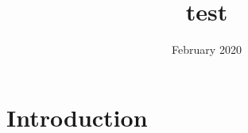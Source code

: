 \documentclass{aa}
\title{test}
\author{ }
\date{February 2020}
\begin{document}
\maketitle

\section{Introduction}

\cite{volodymyrsavchenkoReusableCrosscalibrationWorkflows2019a}




\end{document}
